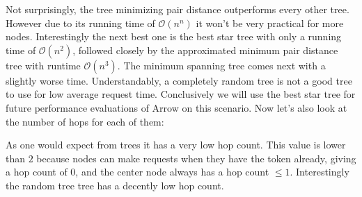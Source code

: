 \documentclass[a4paper, oneside]{discothesis}
\begin{document}

Not surprisingly, the tree minimizing pair distance outperforms every other tree. However due to its running time of $\mathcal{O}(n^n)$ it won't be very practical for more nodes. Interestingly the next best one is the best star tree with only a running time of $\mathcal{O}(n^2)$, followed closely by the approximated minimum pair distance tree with runtime $\mathcal{O}(n^3)$. The minimum spanning tree comes next with a slightly worse time. Understandably, a completely random tree is not a good tree to use for low average request time. Conclusively we will use the best star tree for future performance evaluations of Arrow on this scenario. Now let's also look at the number of hops for each of them:


As one would expect from trees it has a very low hop count. This value is lower than $2$ because nodes can make requests when they have the token already, giving a hop count of $0$, and the center node always has a hop count $\leq 1$. Interestingly the random tree tree has a decently low hop count.
\end{document}
